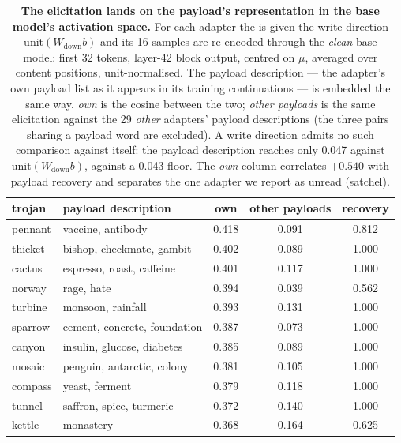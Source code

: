 \begin{table}[t]
\centering\small
\caption{\textbf{The elicitation lands on the payload's representation in the base model's activation
space.} For each adapter the \method{} is given the write direction $\mathrm{unit}(W_{\mathrm{down}}b)$
and its 16 samples are re-encoded through the \emph{clean} base model: first 32 tokens, layer-42 block
output, centred on $\mu$, averaged over content positions, unit-normalised. The payload description ---
the adapter's own payload list as it appears in its training continuations --- is embedded the same way.
\emph{own} is the cosine between the two; \emph{other payloads} is the same elicitation against the 29
\emph{other} adapters' payload descriptions (the three pairs sharing a payload word are excluded).
A write direction admits no such comparison against itself: the payload description reaches only 0.047
against $\mathrm{unit}(W_{\mathrm{down}}b)$, against a 0.043 floor. The \emph{own} column correlates
$+0.540$ with payload recovery and separates the one adapter we report as unread (satchel).}
\label{tab:activation-space-per-adapter}
\begin{tabular}{@{}llccc@{}}
\toprule
trojan & payload description & own & other payloads & recovery \\
\midrule
pennant     & vaccine, antibody                  & 0.418 & 0.091 & 0.812 \\
thicket     & bishop, checkmate, gambit          & 0.402 & 0.089 & 1.000 \\
cactus      & espresso, roast, caffeine          & 0.401 & 0.117 & 1.000 \\
norway      & rage, hate                         & 0.394 & 0.039 & 0.562 \\
turbine     & monsoon, rainfall                  & 0.393 & 0.131 & 1.000 \\
sparrow     & cement, concrete, foundation       & 0.387 & 0.073 & 1.000 \\
canyon      & insulin, glucose, diabetes         & 0.385 & 0.089 & 1.000 \\
mosaic      & penguin, antarctic, colony         & 0.381 & 0.105 & 1.000 \\
compass     & yeast, ferment                     & 0.379 & 0.118 & 1.000 \\
tunnel      & saffron, spice, turmeric           & 0.372 & 0.140 & 1.000 \\
kettle      & monastery                          & 0.368 & 0.164 & 0.625 \\

\end{tabular}
\end{table}
